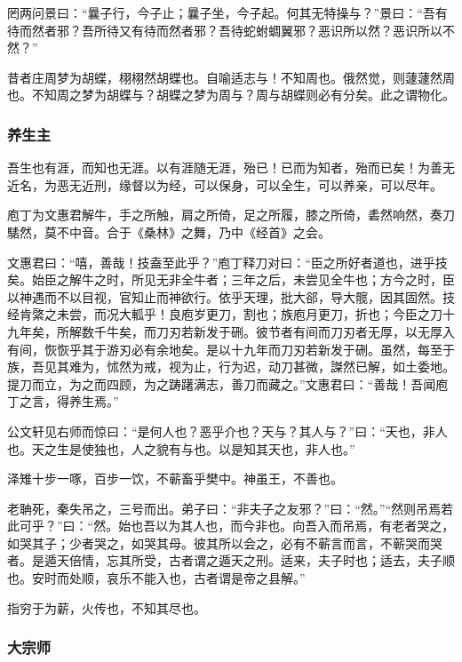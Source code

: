\documentclass[]{article}
\begin{document}
罔两问景曰：``曩子行，今子止；曩子坐，今子起。何其无特操与？''景曰：``吾有待而然者邪？吾所待又有待而然者邪？吾待蛇蚹蜩翼邪？恶识所以然？恶识所以不然？''

昔者庄周梦为胡蝶，栩栩然胡蝶也。自喻适志与！不知周也。俄然觉，则蘧蘧然周也。不知周之梦为胡蝶与？胡蝶之梦为周与？周与胡蝶则必有分矣。此之谓物化。

\hypertarget{header-n57}{%
\subsubsection{养生主}\label{header-n57}}

吾生也有涯，而知也无涯。以有涯随无涯，殆已！已而为知者，殆而已矣！为善无近名，为恶无近刑，缘督以为经，可以保身，可以全生，可以养亲，可以尽年。

庖丁为文惠君解牛，手之所触，肩之所倚，足之所履，膝之所倚，砉然响然，奏刀騞然，莫不中音。合于《桑林》之舞，乃中《经首》之会。

文惠君曰：``嘻，善哉！技盍至此乎？''庖丁释刀对曰：``臣之所好者道也，进乎技矣。始臣之解牛之时，所见无非全牛者；三年之后，未尝见全牛也；方今之时，臣以神遇而不以目视，官知止而神欲行。依乎天理，批大郤，导大髋，因其固然。技经肯綮之未尝，而况大軱乎！良庖岁更刀，割也；族庖月更刀，折也；今臣之刀十九年矣，所解数千牛矣，而刀刃若新发于硎。彼节者有间而刀刃者无厚，以无厚入有间，恢恢乎其于游刃必有余地矣。是以十九年而刀刃若新发于硎。虽然，每至于族，吾见其难为，怵然为戒，视为止，行为迟，动刀甚微，謋然已解，如土委地。提刀而立，为之而四顾，为之踌躇满志，善刀而藏之。''文惠君曰：``善哉！吾闻庖丁之言，得养生焉。''

公文轩见右师而惊曰：``是何人也？恶乎介也？天与？其人与？''曰：``天也，非人也。天之生是使独也，人之貌有与也。以是知其天也，非人也。''

泽雉十步一啄，百步一饮，不蕲畜乎樊中。神虽王，不善也。

老聃死，秦失吊之，三号而出。弟子曰：``非夫子之友邪？''曰：``然。''``然则吊焉若此可乎？''曰：``然。始也吾以为其人也，而今非也。向吾入而吊焉，有老者哭之，如哭其子；少者哭之，如哭其母。彼其所以会之，必有不蕲言而言，不蕲哭而哭者。是遁天倍情，忘其所受，古者谓之遁天之刑。适来，夫子时也；适去，夫子顺也。安时而处顺，哀乐不能入也，古者谓是帝之县解。''

指穷于为薪，火传也，不知其尽也。

\hypertarget{header-n68}{%
\subsubsection{大宗师}\label{header-n68}}
\end{document}
